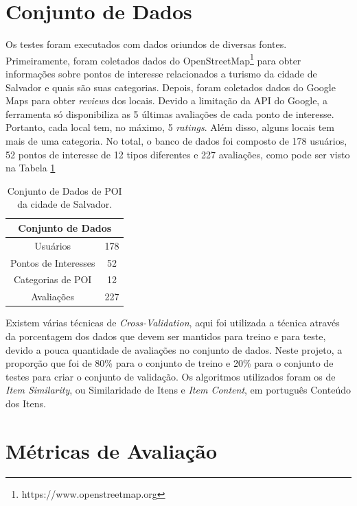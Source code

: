 \section{Conjunto de Dados}

Os testes foram executados com dados oriundos de diversas fontes. Primeiramente, foram coletados dados do OpenStreetMap\footnote{https://www.openstreetmap.org} para obter informações sobre pontos de interesse relacionados a turismo da cidade de Salvador e quais são suas categorias. Depois, foram coletados dados do Google Maps para obter \textit{reviews} dos locais. Devido a limitação da API do Google, a ferramenta só disponibiliza as 5 últimas avaliações de cada ponto de interesse. Portanto, cada local tem, no máximo, 5 \textit{ratings}. Além disso, alguns locais tem mais de uma categoria. No total, o banco de dados foi composto de 178 usuários, 52 pontos de interesse de 12 tipos diferentes e 227 avaliações, como pode ser visto na Tabela \ref{tab:dataset_Salvador}

\begin{table}[H]
	\centering
	\caption{Conjunto de Dados de POI da cidade de Salvador.}
	\label{tab:dataset_Salvador}
	\begin{tabular}{|c|c|}
		\hline
		\multicolumn{2}{|c|}{\textbf{Conjunto de Dados}} \\ \hline
		Usuários                  & 178                   \\ \hline
		Pontos de Interesses      & 52                   \\ \hline
		Categorias de POI         & 12                 \\ \hline
		Avaliações                & 227                 \\ \hline
	\end{tabular}
\end{table}


Existem várias técnicas de \textit{Cross-Validation}, aqui foi utilizada a técnica através da porcentagem dos dados que devem ser mantidos para treino e para teste, devido a pouca quantidade de avaliações no conjunto de dados. Neste projeto, a proporção que foi de 80\% para o conjunto de treino e 20\% para o conjunto de testes para criar o conjunto de validação. Os algoritmos utilizados foram os de \textit{Item Similarity}, ou Similaridade de Itens e \textit{Item Content}, em português Conteúdo dos Itens.

\section{Métricas de Avaliação}

